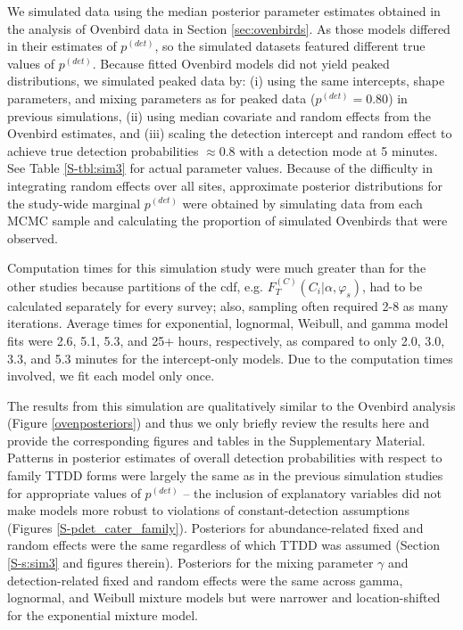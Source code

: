 \documentclass[12pt]{article}
\newcommand{\pdet}{p^{(det)}}
\newcommand{\Fm}{F_T^{(C)}}
\begin{document}
We simulated data using the median posterior parameter estimates obtained in the analysis of Ovenbird data in Section \ref{sec:ovenbirds}.
As those models differed in their estimates of $\pdet$, so the simulated datasets featured different true values of $\pdet$.
Because fitted Ovenbird models did not yield peaked distributions, we simulated peaked data by: (i) using the same intercepts, shape parameters, and mixing parameters as for peaked data ($\pdet = 0.80$) in previous simulations, (ii) using median covariate and random effects from the Ovenbird estimates, and (iii) scaling the detection intercept and random effect to achieve true detection probabilities $\approx 0.8$ with a detection mode at 5 minutes.
See Table \ref{S-tbl:sim3} for actual parameter values.
Because of the difficulty in integrating random effects over all sites, approximate posterior distributions for the study-wide marginal $\pdet$ were obtained by simulating data from each MCMC sample and calculating the proportion of simulated Ovenbirds that were observed.

Computation times for this simulation study were much greater than for the other studies because partitions of the cdf, e.g. $\Fm(C_i|\alpha,\varphi_s)$, had to be calculated separately for every survey; also, sampling often required 2-8 as many iterations.
Average times for exponential, lognormal, Weibull, and gamma model fits were 2.6, 5.1, 5.3, and 25+ hours, respectively, as compared to only 2.0, 3.0, 3.3, and 5.3 minutes for the intercept-only models.
Due to the computation times involved, we fit each model only once.

The results from this simulation are qualitatively similar to the Ovenbird analysis (Figure \ref{ovenposteriors}) and thus we only briefly review the results here and provide the corresponding figures and tables in the Supplementary Material. 
Patterns in posterior estimates of overall detection probabilities with respect to family TTDD forms were largely the same as in the previous simulation studies for appropriate values of $\pdet$ -- the inclusion of explanatory variables did not make models more robust to violations of constant-detection assumptions (Figures \ref{S-pdet_cater_family}).  
Posteriors for abundance-related fixed and random effects were the same regardless of which TTDD was assumed (Section \ref{S-s:sim3} and figures therein).  
Posteriors for the mixing parameter $\gamma$ and detection-related fixed and random effects were the same across gamma, lognormal, and Weibull mixture models but were narrower and location-shifted for the exponential mixture model.  
\end{document}
